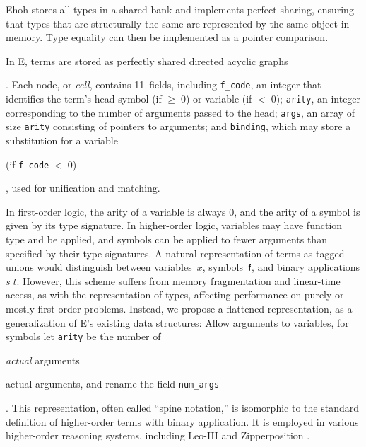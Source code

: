 Ehoh stores all types in a shared bank and
implements perfect sharing, ensuring that types that are structurally the same
are represented by the same object in memory. Type equality can then be
implemented as a pointer comparison.


In E, terms are stored as perfectly shared directed acyclic graphs\begin{rep}
\cite{ls-01-shared}\end{rep}.
%
%
Each node, or \emph{cell}, contains 11~fields, including
\verb|f_code|, an integer that identifies the term's head symbol (if ${\ge}\;0$)
or variable (if ${<}\;0$); \verb|arity|, an integer corresponding to the number
of arguments passed to the head; \verb|args|, an array of size
\verb|arity| consisting of pointers to arguments; and \verb|binding|,
which may store a substitution for a variable\begin{rep} (if
\verb|f_code|$\;{<}\;0$)\end{rep}, used for unification and matching.

In first-order logic, the arity of a variable is always 0, and the arity of a
symbol is given by its type signature.
In higher-order logic, variables may have function type and be applied, and
symbols can be applied to fewer arguments than specified by their type
signatures. A natural representation of \lfhol{} terms as tagged unions
would distinguish between variables~$x$, symbols~$\mathsf{f}$, and binary
applications $s \; t.$ However, this scheme suffers from memory
fragmentation and linear-time access, as with the representation of types,
affecting performance on purely or mostly first-order problems. Instead, we
propose a flattened representation, as a generalization of E's existing data
structures: Allow arguments to variables, for symbols let \verb|arity| be
the number of \begin{conf}\emph{actual} arguments\end{conf}\begin{rep}actual
arguments, %
and rename the field \verb|num_args|\end{rep}. This representation, often called
``spine notation,'' %
is isomorphic to the standard definition of higher-order terms with binary
application. It is employed in various higher-order reasoning systems,
including Leo-III \cite{sb-21-leo3} and
Zipperposition \cite{sc-15-simon-phd,sc-supind-17}.

